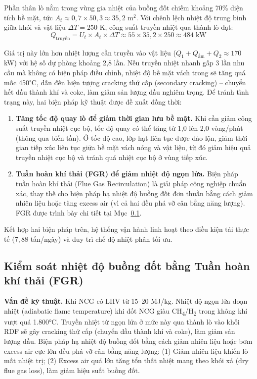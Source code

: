 \documentclass[../main.tex]{subfiles}
\begin{document}
Phần thân lò nằm trong vùng gia nhiệt của buồng đốt chiếm khoảng 70\% diện tích bề mặt, tức $A_t \approx 0{,}7 \times 50{,}3 \approx 35{,}2$ m$^2$. Với chênh lệch nhiệt độ trung bình giữa khói và vật liệu $\Delta T = 250$ K, công suất truyền nhiệt qua thành lò đạt:
\begin{equation}
Q_{\text{truyền}} = U_t \times A_t \times \Delta T
\approx 55 \times 35{,}2 \times 250 \approx 484\;\text{kW}
\end{equation}

Giá trị này lớn hơn nhiệt lượng cần truyền vào vật liệu ($Q_1 + Q_{\text{ẩm}} + Q_2 \approx 170$ kW) với hệ số dự phòng khoảng 2,8 lần. Nếu truyền nhiệt nhanh gấp 3 lần nhu cầu mà không có biện pháp điều chỉnh, nhiệt độ bề mặt vách trong sẽ tăng quá mốc 450$^\circ$C, dẫn đến hiện tượng cracking thứ cấp (secondary cracking) -- chuyển hết dầu thành khí và coke, làm giảm sản lượng dầu nghiêm trọng. Để tránh tình trạng này, hai biện pháp kỹ thuật được đề xuất đồng thời:

\begin{enumerate}
  \item \textbf{Tăng tốc độ quay lò để giảm thời gian lưu bề mặt.} Khi cần giảm công suất truyền nhiệt cục bộ, tốc độ quay có thể tăng từ 1,0 lên 2,0 vòng/phút (thông qua biến tần). Ở tốc độ cao, lớp hạt liên tục được đảo lộn, giảm thời gian tiếp xúc liên tục giữa bề mặt vách nóng và vật liệu, từ đó giảm hiệu quả truyền nhiệt cục bộ và tránh quá nhiệt cục bộ ở vùng tiếp xúc.
  \item \textbf{Tuần hoàn khí thải (FGR) để giảm nhiệt độ ngọn lửa.} Biện pháp tuần hoàn khí thải (Flue Gas Recirculation) là giải pháp công nghiệp chuẩn xác, thay thế cho biện pháp hạ nhiệt độ buồng đốt đơn thuần bằng cách giảm nhiên liệu hoặc tăng excess air (vì cả hai đều phá vỡ cân bằng năng lượng). FGR được trình bày chi tiết tại Mục~\ref{sec:fgr-buong-dot}.
\end{enumerate}

Kết hợp hai biện pháp trên, hệ thống vận hành linh hoạt theo điều kiện tải thực tế ($7{,}88$ tấn/ngày) và duy trì chế độ nhiệt phân tối ưu.

\subsection{Kiểm soát nhiệt độ buồng đốt bằng Tuần hoàn khí thải (FGR)}
\label{sec:fgr-buong-dot}

\textbf{Vấn đề kỹ thuật.} Khí NCG có LHV từ 15--20 MJ/kg. Nhiệt độ ngọn lửa đoạn nhiệt (adiabatic flame temperature) khi đốt NCG giàu CH\textsubscript{4}/H\textsubscript{2} trong không khí vượt quá 1.800°C. Truyền nhiệt từ ngọn lửa ở mức này qua thành lò vào khối RDF sẽ gây cracking thứ cấp (chuyển dầu thành khí và coke), làm giảm sản lượng dầu. Biện pháp hạ nhiệt độ buồng đốt bằng cách giảm nhiên liệu hoặc bơm excess air cực lớn đều phá vỡ cân bằng năng lượng: (1) Giảm nhiên liệu khiến lò mất nhiệt trị; (2) Excess air quá lớn tăng tổn thất nhiệt mang theo khói xả (dry flue gas loss), làm giảm hiệu suất buồng đốt.
\end{document}
